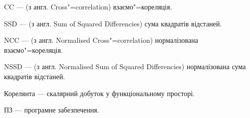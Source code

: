 \shortings{}
CC --- (з англ. Cross"=correlation) взаємо"=кореляція.

SSD --- (з англ. Sum of Squared Differencies) сума квадратів відстаней.

NCC --- (з англ. Normalised Cross"=correlation) нормалізована взаємо"=кореляція.

NSSD --- (з англ. Normalised Sum of Squared Differencies) нормалізована сума квадратів відстаней.

Корелянта --- скалярний добуток у функціональному просторі.

ПЗ --- програмне забезпечення.

